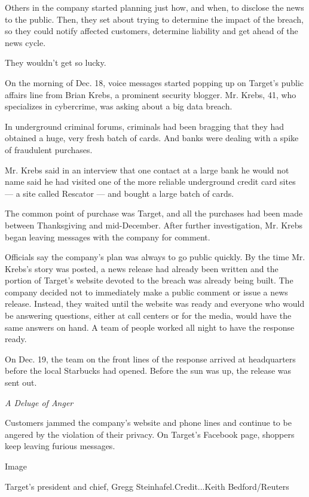 Others in the company started planning just how, and when, to disclose
the news to the public. Then, they set about trying to determine the
impact of the breach, so they could notify affected customers, determine
liability and get ahead of the news cycle.

They wouldn't get so lucky.

On the morning of Dec. 18, voice messages started popping up on Target's
public affairs line from Brian Krebs, a prominent security blogger. Mr.
Krebs, 41, who specializes in cybercrime, was asking about a big data
breach.

In underground criminal forums, criminals had been bragging that they
had obtained a huge, very fresh batch of cards. And banks were dealing
with a spike of fraudulent purchases.

Mr. Krebs said in an interview that one contact at a large bank he would
not name said he had visited one of the more reliable underground credit
card sites --- a site called Rescator --- and bought a large batch of
cards.

The common point of purchase was Target, and all the purchases had been
made between Thanksgiving and mid-December. After further investigation,
Mr. Krebs began leaving messages with the company for comment.

Officials say the company's plan was always to go public quickly. By the
time Mr. Krebs's story was posted, a news release had already been
written and the portion of Target's website devoted to the breach was
already being built. The company decided not to immediately make a
public comment or issue a news release. Instead, they waited until the
website was ready and everyone who would be answering questions, either
at call centers or for the media, would have the same answers on hand. A
team of people worked all night to have the response ready.

On Dec. 19, the team on the front lines of the response arrived at
headquarters before the local Starbucks had opened. Before the sun was
up, the release was sent out.

\emph{A Deluge of Anger}

Customers jammed the company's website and phone lines and continue to
be angered by the violation of their privacy. On Target's Facebook page,
shoppers keep leaving furious messages.

Image

Target's president and chief, Gregg Steinhafel.Credit...Keith
Bedford/Reuters


